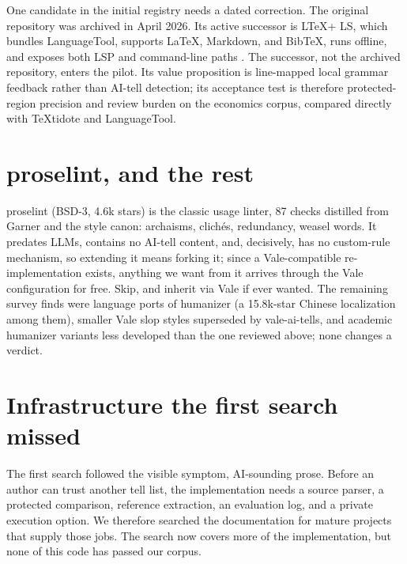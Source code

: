 One candidate in the initial registry needs a dated correction. The original
 repository was archived in April 2026. Its active
successor is LTeX+ LS, which bundles LanguageTool, supports LaTeX, Markdown,
and BibTeX, runs offline, and exposes both LSP and command-line paths
\citep{ltexplus2026}. The successor, not the archived repository, enters the
pilot. Its value proposition is line-mapped local grammar feedback rather
than AI-tell detection; its acceptance test is therefore protected-region
precision and review burden on the economics corpus, compared directly with
TeXtidote and LanguageTool.

\hvFigureLaTeXDiagnosticRoute

\section{proselint, and the rest}
\label{sec:oss-rest}

proselint (BSD-3, 4.6k stars) is the classic usage linter, 87 checks
distilled from Garner and the style canon: archaisms, clich\'es,
redundancy, weasel words. It predates LLMs, contains no AI-tell content,
and, decisively, has no custom-rule mechanism, so extending it means
forking it; since a Vale-compatible re-implementation exists, anything we
want from it arrives through the Vale configuration for free. Skip, and
inherit via Vale if ever wanted. The remaining survey finds were language
ports of humanizer (a 15.8k-star Chinese localization among them), smaller
Vale slop styles superseded by vale-ai-tells, and academic humanizer
variants less developed than the one reviewed above; none changes a
verdict.

\section{Infrastructure the first search missed}
\label{sec:oss-infrastructure}

The first search followed the visible symptom, AI-sounding prose. Before an
author can trust another tell list, the implementation needs a source parser,
a protected comparison, reference extraction, an evaluation log, and a private
execution option. We therefore searched the documentation for mature projects
that supply those jobs. The search now covers more of the implementation, but
none of this code has passed our corpus.

